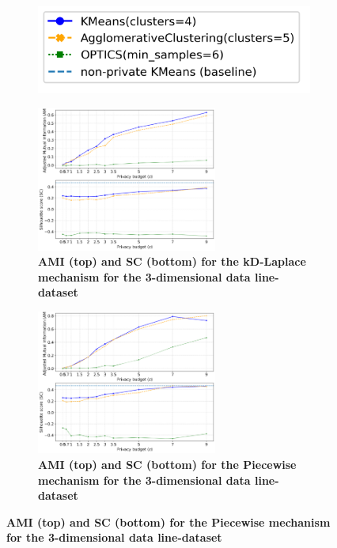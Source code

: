 \begin{figure}[H]
      \centering
      \begin{subfigure}{0.3\textwidth}
            \includegraphics[width=\textwidth]{Results/kd-laplace/kd-Laplace/line-dataset/legend_3.png}
      \end{subfigure}
      \begin{subfigure}{1\textwidth}
            \caption{\textbf{AMI (top) and SC (bottom) for the kD-Laplace mechanism for the 3-dimensional data line-dataset}}
            \centering
            \includegraphics[width=0.65\textwidth]{Results/kd-laplace/kd-Laplace/line-dataset/ami-and-sc_3_dimensions.png}
            \centering
      \end{subfigure}
      \begin{subfigure}{1\textwidth}
            \caption{\textbf{AMI (top) and SC (bottom) for the Piecewise mechanism for the 3-dimensional data line-dataset}}
            \centering
            \includegraphics[width=0.65\textwidth]{Results/kd-laplace/piecewise/line-dataset/ami-and-sc_3_dimensions.png}
      \end{subfigure}
      \label{fig:validation-line-dataset_comparison_3d-laplace}
\end{figure}
